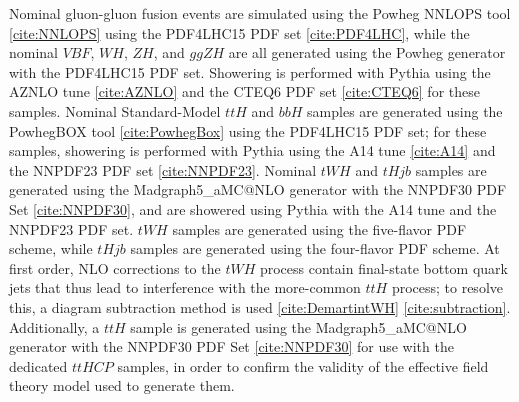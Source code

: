 \begin{table}[h!]
  \centering
  \caption{Summary of nominal signal samples}
  \label{tab:signal_samples_pyt}
\end{table}

Nominal gluon-gluon fusion events are simulated using the Powheg NNLOPS tool \ref{cite:NNLOPS} using the PDF4LHC15 PDF set \ref{cite:PDF4LHC}, while the nominal $VBF$, $WH$, $ZH$, and $ggZH$ are all generated using the Powheg generator with the PDF4LHC15 PDF set. Showering is performed with Pythia using the AZNLO tune \ref{cite:AZNLO} and the CTEQ6 PDF set \ref{cite:CTEQ6} for these samples. Nominal Standard-Model $ttH$ and $bbH$ samples are generated using the PowhegBOX tool \ref{cite:PowhegBox} using the PDF4LHC15 PDF set; for these samples, showering is performed with Pythia using the A14 tune \ref{cite:A14} and the NNPDF23 PDF set \ref{cite:NNPDF23}. Nominal $tWH$ and $tHjb$ samples are generated using the Madgraph5\_aMC@NLO generator with the NNPDF30 PDF Set \ref{cite:NNPDF30}, and are showered using Pythia with the A14 tune and the NNPDF23 PDF set. $tWH$ samples are generated using the five-flavor PDF scheme, while $tHjb$ samples are generated using the four-flavor PDF scheme. At first order, NLO corrections to the $tWH$ process contain final-state bottom quark jets that thus lead to interference with the more-common $ttH$ process; to resolve this, a diagram subtraction method is used \ref{cite:DemartintWH} \ref{cite:subtraction}. Additionally, a $ttH$ sample is generated using the Madgraph5\_aMC@NLO generator with the NNPDF30 PDF Set \ref{cite:NNPDF30} for use with the dedicated $ttH CP$ samples, in order to confirm the validity of the effective field theory model used to generate them.

